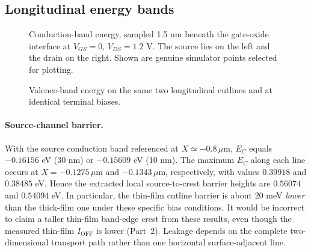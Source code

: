 \subsection{Longitudinal energy bands}
\begin{figure}[H]\centering
{}
\caption{Conduction-band energy, sampled 1.5 nm beneath the
gate-oxide interface at $V_{GS}=0$, $V_{DS}=1.2$ V.
The source lies on the left and the drain on the right.
Shown are genuine simulator points selected for plotting.}
\label{fig:part5_long_ec}
\end{figure}

\begin{figure}[H]\centering
{}
\caption{Valence-band energy on the same two longitudinal
cutlines and at identical terminal biases.}
\label{fig:part5_long_ev}
\end{figure}

\paragraph{Source-channel barrier.}
With the source conduction band referenced at
$X\simeq-0.8\,\mu$m, $E_C$ equals $-0.16156$ eV
(30 nm) or $-0.15609$ eV (10 nm).
The maximum $E_C$ along each line occurs at
$X=-0.1275\,\mu$m and $-0.1343\,\mu$m,
respectively, with values $0.39918$ and
$0.38485$ eV. Hence the extracted local
source-to-crest barrier heights are
$0.56074$ and $0.54094$ eV. In particular,
the thin-film cutline barrier is about
20 meV \emph{lower} than the thick-film
one under these specific bias conditions.
It would be incorrect to claim a taller
thin-film band-edge crest from these results,
even though the measured thin-film
$I_{\mathrm{OFF}}$ is lower (Part~2).
Leakage depends on the complete two-dimensional
transport path rather than one horizontal
surface-adjacent line.

